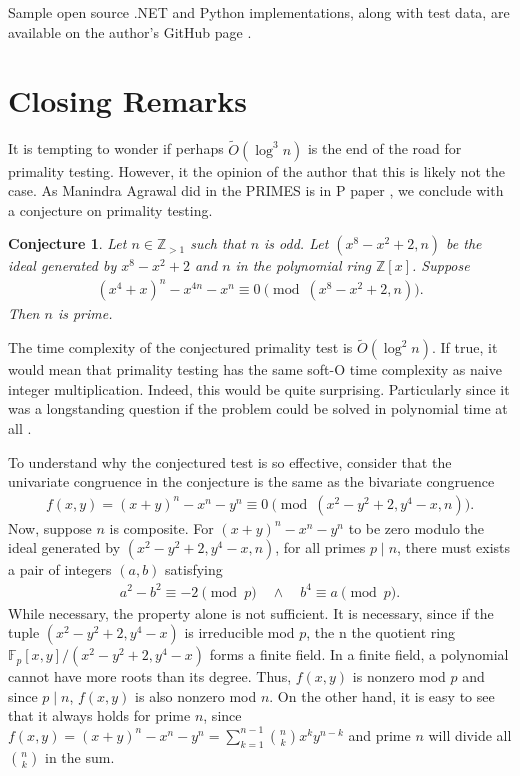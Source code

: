 \documentclass{article}
\theoremstyle{plain}
\newtheorem*{conjecture*}{Conjecture}
\theoremstyle{definition}
\newcommand{\Z}{\mathbb{Z}}
\begin{document}
Sample open source .NET and Python implementations, along with test data, are available on the author's GitHub page \cite{githubrepo}.

\section{Closing Remarks}
It is tempting to wonder if perhaps $\tilde{O}(\log^3 n)$ is the end of the road for primality testing. However, it the opinion of the author that this is likely not the case. As Manindra Agrawal did in the PRIMES is in P paper \cite{aks2002}, we conclude with a conjecture on primality testing.
\begin{conjecture*}
Let $n \in \mathbb{Z}_{>1}$ such that $n$ is odd. Let $(x^8 - x^2 + 2, n)$ be the ideal generated by $x^8 - x^2 + 2$ and $n$ in the polynomial ring $\Z[x]$. Suppose
\begin{align*}
    (x^4 + x)^n - x^{4n} - x^n \equiv 0 \pmod{(x^8 - x^2 + 2, n)} .
\end{align*}
Then $n$ is prime.
\end{conjecture*}
The time complexity of the conjectured primality test is $\tilde{O}(\log^2 n)$. If true, it would mean that primality testing has the same soft-O time complexity as naive integer multiplication. Indeed, this would be quite surprising. Particularly since it was a longstanding question if the problem could be solved in polynomial time at all \cite{aks2002, granville2004primes}.

To understand why the conjectured test is so effective, consider that the univariate congruence in the conjecture is the same as the bivariate congruence
\begin{align*}
    f(x,y) = (x+y)^n - x^n - y^n \equiv 0 \pmod{(x^2-y^2+2, y^4-x, n)} .
\end{align*}
Now, suppose $n$ is composite. For $(x+y)^n - x^n - y^n$ to be zero modulo the ideal generated by $(x^2-y^2+2, y^4-x, n)$, for all primes $p \mid n$, there must exists a pair of integers $(a,b)$ satisfying
\begin{align*}
    a^2 - b^2 \equiv -2 \pmod{p} \quad \land \quad b^4 \equiv a \pmod{p} . 
\end{align*}
While necessary, the property alone is not sufficient. It is necessary, since if the tuple $(x^2-y^2+2, y^4-x)$ is irreducible mod $p$, the
n the quotient ring $\mathbb{F}_p[x,y]/(x^2-y^2+2, y^4-x)$ forms a finite field. In a finite field, a polynomial cannot have more roots than its degree. Thus, $f(x,y)$ is nonzero mod $p$ and since $p \mid n$, $f(x,y)$ is also nonzero mod $n$. On the other hand, it is easy to see that it always holds for prime $n$, since $f(x,y) = (x+y)^n - x^n - y^n = \sum_{k=1}^{n-1} \binom{n}{k} x^k y^{n-k}$ and prime $n$ will divide all $\binom{n}{k}$ in the sum.
\end{document}
